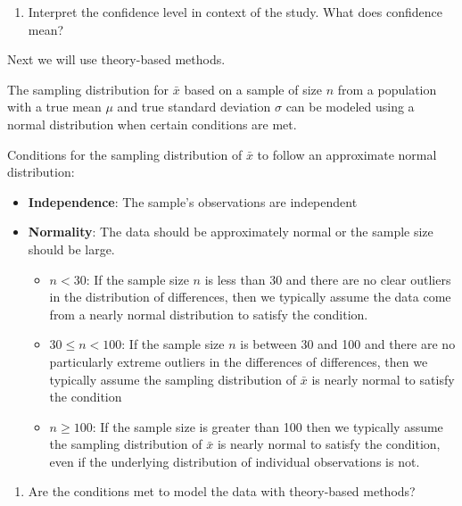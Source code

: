 \documentclass[
]{report}
\providecommand{\tightlist}{%
  \setlength{\itemsep}{0pt}\setlength{\parskip}{0pt}}
\begin{document}
\vspace{0.8in}

\begin{enumerate}
\def\labelenumi{\arabic{enumi}.}
\setcounter{enumi}{10}
\tightlist
\item
  Interpret the confidence level in context of the study. What does confidence mean?
\end{enumerate}

\vspace{0.8in}

Next we will use theory-based methods.

The sampling distribution for \(\bar{x}\) based on a sample of size \(n\) from a population with a true mean \(\mu\) and true standard deviation \(\sigma\) can be modeled using a normal distribution when certain conditions are met.

Conditions for the sampling distribution of \(\bar{x}\) to follow an approximate normal distribution:

\begin{itemize}
\item
  \textbf{Independence}: The sample's observations are independent
\item
  \textbf{Normality}: The data should be approximately normal or the sample size should be large.

  \begin{itemize}
  \item
    \(n < 30\): If the sample size \(n\) is less than 30 and there are no clear outliers in the distribution of differences, then we typically assume the data come from a nearly normal distribution to satisfy the condition.
  \item
    \(30 \le n < 100\): If the sample size \(n\) is between 30 and 100 and there are no particularly extreme outliers in the differences of differences, then we typically assume the sampling distribution of \(\bar{x}\) is nearly normal to satisfy the condition
  \item
    \(n \ge 100\): If the sample size is greater than 100 then we typically assume the sampling distribution of \(\bar{x}\) is nearly normal to satisfy the condition, even if the underlying distribution of individual observations is not.
  \end{itemize}
\end{itemize}

\begin{enumerate}
\def\labelenumi{\arabic{enumi}.}
\setcounter{enumi}{11}
\tightlist
\item
  Are the conditions met to model the data with theory-based methods?
\end{enumerate}
\end{document}
